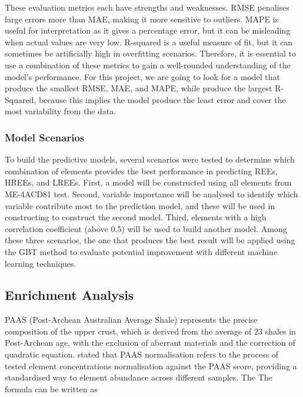 \documentclass[11pt,a4paper,]{article}
\begin{document}
These evaluation metrics each have strengths and weaknesses. RMSE penalises large errors more than MAE, making it more sensitive to outliers. MAPE is useful for interpretation as it gives a percentage error, but it can be misleading when actual values are very low. R-squared is a useful measure of fit, but it can sometimes be artificially high in overfitting scenarios. Therefore, it is essential to use a combination of these metrics to gain a well-rounded understanding of the model's performance. For this project, we are going to look for a model that produce the smallest RMSE, MAE, and MAPE, while produce the largest R-Squared, because this implies the model produce the least error and cover the most variability from the data.

\subsubsection{Model Scenarios}\label{model-scenarios}

To build the predictive models, several scenarios were tested to determine which combination of elements provides the best performance in predicting REEs, HREEs, and LREEs. First, a model will be constructed using all elements from ME-4ACD81 test. Second, variable importance will be analysed to identify which variable contribute most to the prediction model, and these will be used in constructing to construct the second model. Third, elements with a high correlation coefficient (above 0.5) will be used to build another model. Among these three scenarios, the one that produces the best result will be applied using the GBT method to evaluate potential improvement with different machine learning techniques.

\subsection{Enrichment Analysis}\label{enrichment-analysis}

PAAS (Post-Archean Australian Average Shale) represents the precise composition of the upper crust, which is derived from the average of 23 shales in Post-Archean age, with the exclusion of aberrant materials and the correction of quadratic equation. \textcite{McLennan1989} stated that PAAS normalisation refers to the process of tested element concentrations normalisation against the PAAS score, providing a standardised way to element abundance across different samples. The The formula can be written as
\end{document}
